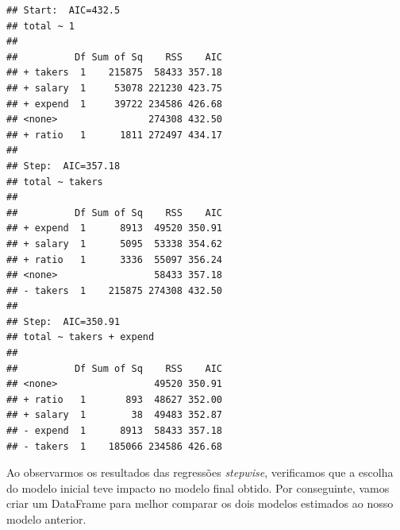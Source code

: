 \documentclass[]{article}
\begin{document}
\begin{Shaded}
\begin{Highlighting}[]
\OtherTok{\textless{}{-}}  \NormalTok{, } 
\end{Highlighting}
\end{Shaded}

\begin{verbatim}
## Start:  AIC=432.5
## total ~ 1
## 
##          Df Sum of Sq    RSS    AIC
## + takers  1    215875  58433 357.18
## + salary  1     53078 221230 423.75
## + expend  1     39722 234586 426.68
## <none>                274308 432.50
## + ratio   1      1811 272497 434.17
## 
## Step:  AIC=357.18
## total ~ takers
## 
##          Df Sum of Sq    RSS    AIC
## + expend  1      8913  49520 350.91
## + salary  1      5095  53338 354.62
## + ratio   1      3336  55097 356.24
## <none>                 58433 357.18
## - takers  1    215875 274308 432.50
## 
## Step:  AIC=350.91
## total ~ takers + expend
## 
##          Df Sum of Sq    RSS    AIC
## <none>                 49520 350.91
## + ratio   1       893  48627 352.00
## + salary  1        38  49483 352.87
## - expend  1      8913  58433 357.18
## - takers  1    185066 234586 426.68
\end{verbatim}

Ao observarmos os resultados das regressões \emph{stepwise}, verificamos
que a escolha do modelo inicial teve impacto no modelo final obtido. Por
conseguinte, vamos criar um DataFrame para melhor comparar os dois
modelos estimados ao nosso modelo anterior.

\begin{Shaded}
\begin{Highlighting}[]
\OtherTok{\textless{}{-}} \NormalTok{(}
              \SpecialCharTok{$}
\OtherTok{\textless{}{-}} \NormalTok{(}
              \SpecialCharTok{$}
\OtherTok{\textless{}{-}} \NormalTok{(}
              \SpecialCharTok{$}
\OtherTok{\textless{}{-}} 
\OtherTok{\textless{}{-}} \NormalTok{(}\NormalTok{,}\NormalTok{,}\NormalTok{)}
\end{Highlighting}
\end{Shaded}
\end{document}
